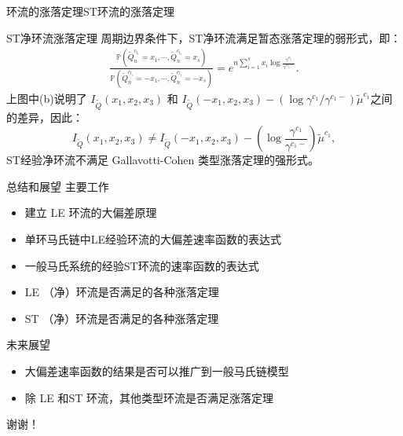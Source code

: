 \documentclass{beamer}
\newcommand{\Pnum}{\mathbb{P}}
\begin{document}
\begin{frame}{环流的涨落定理}{ST环流的涨落定理}
	\begin{block}{ST净环流涨落定理}
		周期边界条件下，ST净环流满足暂态涨落定理的弱形式，即：
		\begin{equation*}\label{weak2}
			\begin{split}
				\frac{\Pnum\left(\tilde{Q}^{c_{l_1}}_n=x_1,\cdots, \tilde{Q}^{c_{l_s}}_n=x_{s}\right)}
				{\Pnum\left(\tilde{Q}^{c_{l_1}}_n=-x_1,\cdots, \tilde{Q}^{c_{l_s}}_n=-x_{s}\right)}
				=e^{n\sum_{i=1}^{s}x_i\log\frac{\gamma^{c_{l_i}}}{\gamma^{c_{l_i}-}}}.
			\end{split}
		\end{equation*}
		上图中(b)说明了 $I_{\tilde{Q}}(x_1, x_2, x_3)$ 和 $ I_{\tilde{Q}}(-x_1, x_2, x_3) -\left(\log \gamma^{c_1} / \gamma^{c_1-}\right)\tilde{\mu}^{c_1}$之间的差异，因此：
		\begin{equation*}
			I_{\tilde{Q}}(x_1, x_2, x_3) \neq I_{\tilde{Q}}(-x_1, x_2, x_3) -\left(\log\frac{\gamma^{c_1}}{\gamma^{c_1-}}\right)\tilde{\mu}^{c_1},
		\end{equation*}
		ST经验净环流不满足 Gallavotti-Cohen 类型涨落定理的强形式。
	\end{block}
\end{frame}

\begin{frame}{总结和展望}
	主要工作
	\begin{itemize}
		\item 建立 LE 环流的大偏差原理
		\item 单环马氏链中LE经验环流的大偏差速率函数的表达式
		\item 一般马氏系统的经验ST环流的速率函数的表达式
		\item LE （净）环流是否满足的各种涨落定理
		\item ST （净）环流是否满足的各种涨落定理
	\end{itemize}
	未来展望
	\begin{itemize}
		\item 大偏差速率函数的结果是否可以推广到一般马氏链模型
		\item 除 LE 和ST 环流，其他类型环流是否满足涨落定理
	\end{itemize}
\end{frame}


\begin{frame}
	\begin{center}
		\Huge 谢谢！
	\end{center}
\end{frame}
\end{document}
